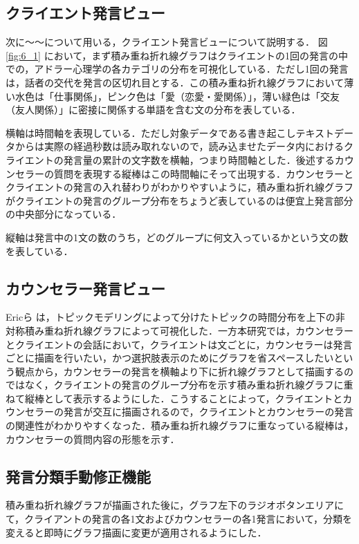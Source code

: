 \documentclass[shuuron]{kuee}
\begin{document}
\subsection{クライエント発言ビュー}
次に〜〜について用いる，クライエント発言ビューについて説明する．
図
\ref{fig:6_1}
において，まず積み重ね折れ線グラフはクライエントの1回の発言の中での，アドラー心理学の各カテゴリの分布を可視化している．ただし1回の発言は，話者の交代を発言の区切れ目とする．この積み重ね折れ線グラフにおいて薄い水色は「仕事関係」，ピンク色は「愛（恋愛・愛関係）」，薄い緑色は「交友（友人関係）」に密接に関係する単語を含む文の分布を表している．

横軸は時間軸を表現している．ただし対象データである書き起こしテキストデータからは実際の経過秒数は読み取れないので，読み込ませたデータ内におけるクライエントの発言量の累計の文字数を横軸，つまり時間軸とした．後述するカウンセラーの質問を表現する縦棒はこの時間軸にそって出現する．カウンセラーとクライエントの発言の入れ替わりがわかりやすいように，積み重ね折れ線グラフがクライエントの発言のグループ分布をちょうど表しているのは便宜上発言部分の中央部分になっている．

縦軸は発言中の1文の数のうち，どのグループに何文入っているかという文の数を表している．





\subsection{カウンセラー発言ビュー}

Ericら\cite{taskdriven}
は，トピックモデリングによって分けたトピックの時間分布を上下の非対称積み重ね折れ線グラフによって可視化した．一方本研究では，カウンセラーとクライエントの会話において，クライエントは文ごとに，カウンセラーは発言ごとに描画を行いたい，かつ選択肢表示のためにグラフを省スペースしたいという観点から，カウンセラーの発言を横軸より下に折れ線グラフとして描画するのではなく，クライエントの発言のグループ分布を示す積み重ね折れ線グラフに重ねて縦棒として表示するようにした．こうすることによって，クライエントとカウンセラーの発言が交互に描画されるので，クライエントとカウンセラーの発言の関連性がわかりやすくなった．積み重ね折れ線グラフに重なっている縦棒は，カウンセラーの質問内容の形態を示す．


\subsection{発言分類手動修正機能}
積み重ね折れ線グラフが描画された後に，グラフ左下のラジオボタンエリアにて，クライアントの発言の各1文およびカウンセラーの各1発言において，分類を変えると即時にグラフ描画に変更が適用されるようにした．
\end{document}
